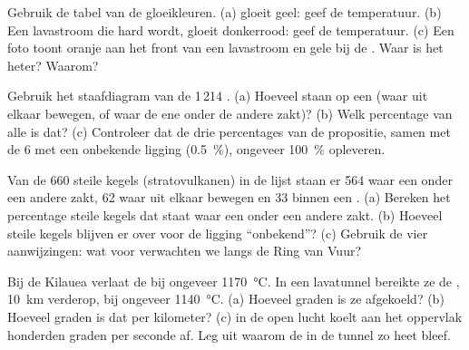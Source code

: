 \begin{exercise}[$\star$]\label{exo:g7:volcanoes:4}
Gebruik de tabel van de gloeikleuren. (a)  gloeit geel: geef de
temperatuur. (b) Een lavastroom die hard wordt, gloeit donkerrood: geef de
temperatuur. (c) Een foto toont oranje  aan het front van een
lavastroom en gele  bij de . Waar is het heter? Waarom?
\end{exercise}

\begin{exercise}[$\star\star$]\label{exo:g7:volcanoes:5}
Gebruik het staafdiagram van de 1\,214 . (a) Hoeveel  staan
op een  (waar  uit elkaar bewegen, of waar de ene onder de
andere zakt)? (b) Welk percentage van alle  is dat? (c) Controleer
dat de drie percentages van de propositie, samen met de 6  met een
onbekende ligging (0.5~\%), ongeveer 100~\% opleveren.
\end{exercise}

\begin{exercise}[$\star\star$]\label{exo:g7:volcanoes:6}
Van de 660 steile kegels (stratovulkanen) in de lijst staan er 564 waar een
 onder een andere zakt, 62 waar  uit elkaar bewegen en 33 binnen
een . (a) Bereken het percentage steile kegels dat staat waar een 
onder een andere zakt. (b) Hoeveel steile kegels blijven er over voor de
ligging ``onbekend''? (c) Gebruik de vier aanwijzingen: wat voor
 verwachten we langs de Ring van Vuur?
\end{exercise}

\begin{exercise}[$\star\star$]\label{exo:g7:volcanoes:7}
Bij de Kilauea verlaat  de  bij ongeveer
\qty{1170}{\degreeCelsius}. In een lavatunnel bereikte ze de ,
\qty{10}{km} verderop, bij ongeveer \qty{1140}{\degreeCelsius}. (a) Hoeveel
graden is ze afgekoeld? (b) Hoeveel graden is dat per kilometer? (c)  in
de open lucht koelt aan het oppervlak honderden graden per seconde af. Leg
uit waarom de  in de tunnel zo heet bleef.
\end{exercise}

